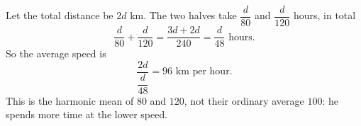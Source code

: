 Let the total distance be $2d$ km. The two halves take $\dfrac{d}{80}$ and $\dfrac{d}{120}$ hours, in total
\[
\dfrac{d}{80}+\dfrac{d}{120}=\dfrac{3d+2d}{240}=\dfrac{d}{48}\text{ hours}.
\]
So the average speed is
\[
\dfrac{2d}{\dfrac{d}{48}}=\boxed{96}\text{ km per hour}.
\]
This is the harmonic mean of $80$ and $120$, not their ordinary average $100$: he spends more time at the lower speed.
